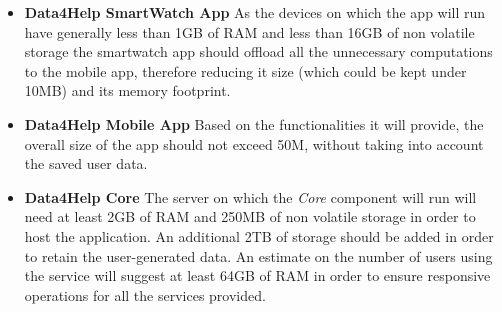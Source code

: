 \begin{itemize}
    \item \textbf{Data4Help SmartWatch App} As the devices on which the app will run have generally less than 1GB of RAM and less than 16GB of non volatile storage the smartwatch app should offload all the unnecessary computations to the mobile app, therefore reducing it size (which could be kept under 10MB) and its memory footprint.
    \item \textbf{Data4Help Mobile App} Based on the functionalities it will provide, the overall size of the app should not exceed 50M, without taking into account the saved user data.
    \item \textbf{Data4Help Core} The server on which the \textit{Core} component will run will need at least 2GB of RAM and 250MB of non volatile storage in order to host the application. An additional 2TB of storage should be added in order to retain the user-generated data. \newline An estimate on the number of users using the service will suggest at least 64GB of RAM in order to ensure responsive operations for all the services provided.
    
\end{itemize}

